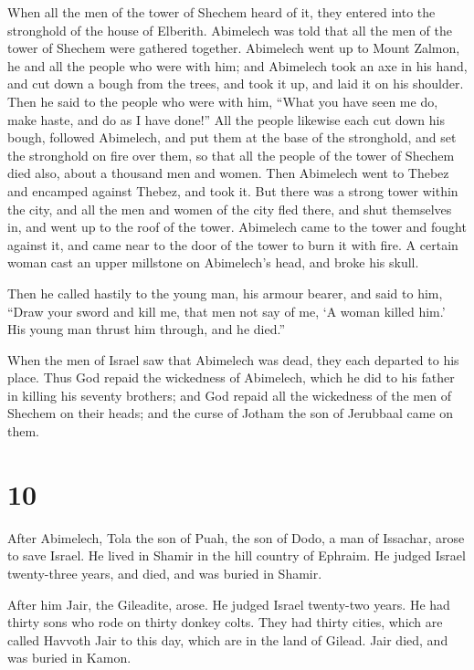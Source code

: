  When all the men of the tower of Shechem heard of it, they
entered into the stronghold of the house of Elberith. 
Abimelech was told that all the men of the tower of Shechem were
gathered together.  Abimelech went up to Mount Zalmon, he
and all the people who were with him; and Abimelech took an axe in his
hand, and cut down a bough from the trees, and took it up, and laid it
on his shoulder. Then he said to the people who were with him, ``What
you have seen me do, make haste, and do as I have done!'' 
All the people likewise each cut down his bough, followed Abimelech, and
put them at the base of the stronghold, and set the stronghold on fire
over them, so that all the people of the tower of Shechem died also,
about a thousand men and women.  Then Abimelech went to
Thebez and encamped against Thebez, and took it.  But there
was a strong tower within the city, and all the men and women of the
city fled there, and shut themselves in, and went up to the roof of the
tower.  Abimelech came to the tower and fought against it,
and came near to the door of the tower to burn it with fire.
 A certain woman cast an upper millstone on Abimelech's
head, and broke his skull.

 Then he called hastily to the young man, his armour
bearer, and said to him, ``Draw your sword and kill me, that men not say
of me, `A woman killed him.' His young man thrust him through, and he
died.''

 When the men of Israel saw that Abimelech was dead, they
each departed to his place.  Thus God repaid the wickedness
of Abimelech, which he did to his father in killing his seventy
brothers;  and God repaid all the wickedness of the men of
Shechem on their heads; and the curse of Jotham the son of Jerubbaal
came on them.

\hypertarget{section-9}{%
\section{10}\label{section-9}}

 After Abimelech, Tola the son of Puah, the son of Dodo, a
man of Issachar, arose to save Israel. He lived in Shamir in the hill
country of Ephraim.  He judged Israel twenty-three years,
and died, and was buried in Shamir.

 After him Jair, the Gileadite, arose. He judged Israel
twenty-two years.  He had thirty sons who rode on thirty
donkey colts. They had thirty cities, which are called Havvoth Jair to
this day, which are in the land of Gilead.  Jair died, and
was buried in Kamon.

